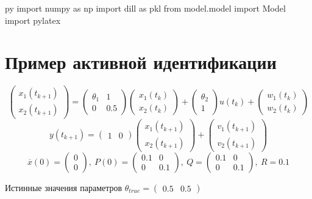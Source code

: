 \documentclass[a4paper,14pt]{extarticle}
\newcommand{\fut}[0]{t_{k+1}}
\begin{document}
\begin{pythontexcustomcode}{py}
import numpy as np
import dill as pkl
from model.model import Model
import pylatex
\end{pythontexcustomcode}

\section{Пример активной идентификации}

\[
  \begin{pmatrix} x_1(\fut) \\ x_2(\fut) \end{pmatrix} =
  \begin{pmatrix} \theta_1 & 1 \\ 0 & 0.5 \end{pmatrix}
  \begin{pmatrix} x_1(t_k) \\ x_2(t_k) \end{pmatrix}
  + 
	\begin{pmatrix} \theta_2 \\ 1 \end{pmatrix}
	u(t_k) 
  + \begin{pmatrix} w_1(t_k) \\ w_2(t_k) \end{pmatrix}
\]
\[
  y(\fut) =
	\begin{pmatrix} 1 & 0 \end{pmatrix}
	\begin{pmatrix} x_1(\fut) \\ x_2(\fut) \end{pmatrix} +
  \begin{pmatrix} v_1(\fut) \\ v_2(\fut) \end{pmatrix}
\]
\[
  \overline{x}(0) = \begin{pmatrix} 0 \\ 0 \end{pmatrix},\
  P(0) = \begin{pmatrix} 0.1 & 0 \\ 0 & 0.1 \end{pmatrix},\
  Q = \begin{pmatrix} 0.1 & 0 \\ 0 & 0.1 \end{pmatrix},\
  R = 0.1 
\]

Истинные значения параметров
$\theta_{true} = \begin{pmatrix} 0.5 & 0.5 \end{pmatrix}$ \\
\end{document}
